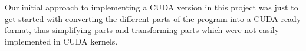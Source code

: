 Our initial approach to implementing a CUDA version in this project was just to get started with converting the different parts of the program into a CUDA ready format, thus simplifying parts and transforming parts which were not easily implemented in CUDA kernels.





